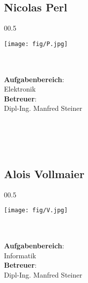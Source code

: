 \subsection*{Nicolas Perl}
\begin{wrapfigure}[10]{0}{0.5\textwidth}
\begin{center}
  \texttt{[image: fig/P.jpg]}
\end{center}
\end{wrapfigure}
\mbox{}\\
\mbox{}\\
\textbf{Aufgabenbereich}:\\
Elektronik\\
\textbf{Betreuer}:\\
Dipl-Ing. Manfred Steiner
\mbox{}\\
\mbox{}\\
\mbox{}\\
\mbox{}\\
\mbox{}\\
\newpage
\subsection*{Alois Vollmaier}
\begin{wrapfigure}[10]{0}{0.5\textwidth}
\begin{center}
  \texttt{[image: fig/V.jpg]}
\end{center}
\end{wrapfigure}
\mbox{}\\
\mbox{}\\
\textbf{Aufgabenbereich}:\\
Informatik\\
\textbf{Betreuer}:\\
Dipl-Ing. Manfred Steiner
\mbox{}\\
\mbox{}\\
\mbox{}\\
\mbox{}\\
\mbox{}\\
\mbox{}\\